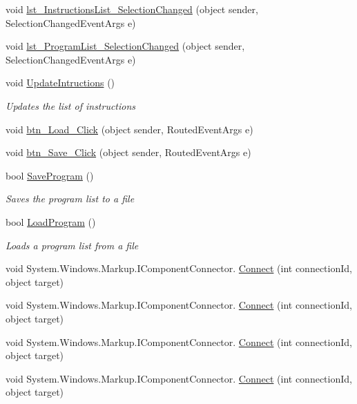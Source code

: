 \begin{DoxyCompactItemize}
void \hyperlink{class_c_p_u___o_s___simulator_1_1_main_window_a5013d1984fc170246a5dc0d26c6fc493}{lst\+\_\+\+Instructions\+List\+\_\+\+Selection\+Changed} (object sender, Selection\+Changed\+Event\+Args e)
\item 
void \hyperlink{class_c_p_u___o_s___simulator_1_1_main_window_ab563b461cf3d62bd3c88eeb7921bfa75}{lst\+\_\+\+Program\+List\+\_\+\+Selection\+Changed} (object sender, Selection\+Changed\+Event\+Args e)
\item 
void \hyperlink{class_c_p_u___o_s___simulator_1_1_main_window_a677bf9ebdb9fe30caa0f52f93e5390c9}{Update\+Intructions} ()
\begin{DoxyCompactList}\small\item\em Updates the list of instructions \end{DoxyCompactList}\item 
void \hyperlink{class_c_p_u___o_s___simulator_1_1_main_window_a13c54c19f906fc84076fe654f82f5398}{btn\+\_\+\+Load\+\_\+\+Click} (object sender, Routed\+Event\+Args e)
\item 
void \hyperlink{class_c_p_u___o_s___simulator_1_1_main_window_a3bbf0774868d6b5da4ff08d70e236fa6}{btn\+\_\+\+Save\+\_\+\+Click} (object sender, Routed\+Event\+Args e)
\item 
bool \hyperlink{class_c_p_u___o_s___simulator_1_1_main_window_a843bbe93c5c2225820d216cc1cb7d4e9}{Save\+Program} ()
\begin{DoxyCompactList}\small\item\em Saves the program list to a file \end{DoxyCompactList}\item 
bool \hyperlink{class_c_p_u___o_s___simulator_1_1_main_window_ad788d74c9d6582f3302912cbbba410b0}{Load\+Program} ()
\begin{DoxyCompactList}\small\item\em Loads a program list from a file \end{DoxyCompactList}\item 
void System.\+Windows.\+Markup.\+I\+Component\+Connector. \hyperlink{class_c_p_u___o_s___simulator_1_1_main_window_ae66177a5319cf24975b9dfab71bc830e}{Connect} (int connection\+Id, object target)
\item 
void System.\+Windows.\+Markup.\+I\+Component\+Connector. \hyperlink{class_c_p_u___o_s___simulator_1_1_main_window_ae66177a5319cf24975b9dfab71bc830e}{Connect} (int connection\+Id, object target)
\item 
void System.\+Windows.\+Markup.\+I\+Component\+Connector. \hyperlink{class_c_p_u___o_s___simulator_1_1_main_window_ae66177a5319cf24975b9dfab71bc830e}{Connect} (int connection\+Id, object target)
\item 
void System.\+Windows.\+Markup.\+I\+Component\+Connector. \hyperlink{class_c_p_u___o_s___simulator_1_1_main_window_ae66177a5319cf24975b9dfab71bc830e}{Connect} (int connection\+Id, object target)
\end{DoxyCompactItemize}
